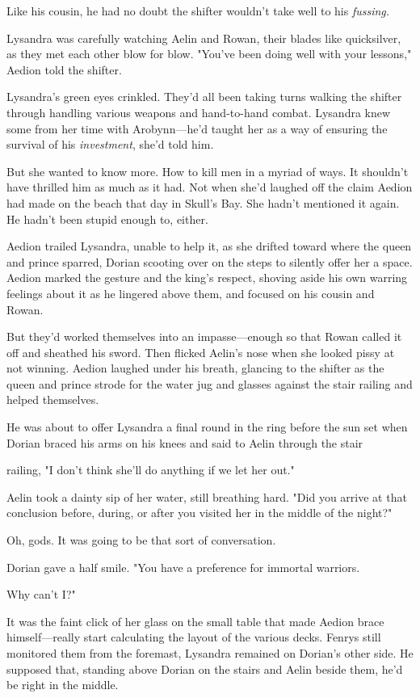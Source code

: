 Like his cousin, he had no doubt the shifter wouldn't take well to his
\emph{fussing.}

Lysandra was carefully watching Aelin and Rowan, their blades like quicksilver, as they met each other blow for blow. "You've been doing well with your lessons," Aedion told the shifter.

Lysandra's green eyes crinkled. They'd all been taking turns walking the shifter through handling various weapons and hand-to-hand combat. Lysandra knew some from her time with Arobynn---he'd taught her as a way of ensuring the survival of his \emph{investment}, she'd told him.

But she wanted to know more. How to kill men in a myriad of ways. It shouldn't have thrilled him as much as it had. Not when she'd laughed off the claim Aedion had made on the beach that day in Skull's Bay. She hadn't mentioned it again. He hadn't been stupid enough to, either.

Aedion trailed Lysandra, unable to help it, as she drifted toward where the queen and prince sparred, Dorian scooting over on the steps to silently offer her a space. Aedion marked the gesture and the king's respect, shoving aside his own warring feelings about it as he lingered above them, and focused on his cousin and Rowan.

But they'd worked themselves into an impasse---enough so that Rowan called it off and sheathed his sword. Then flicked Aelin's nose when she looked pissy at not winning. Aedion laughed under his breath, glancing to the shifter as the queen and prince strode for the water jug and glasses against the stair railing and helped themselves.

He was about to offer Lysandra a final round in the ring before the sun set when Dorian braced his arms on his knees and said to Aelin through the stair

railing, "I don't think she'll do anything if we let her out."

Aelin took a dainty sip of her water, still breathing hard. "Did you arrive at that conclusion before, during, or after you visited her in the middle of the night?"

Oh, gods. It was going to be that sort of conversation.

Dorian gave a half smile. "You have a preference for immortal warriors.

Why can't I?"

It was the faint click of her glass on the small table that made Aedion brace himself---really start calculating the layout of the various decks. Fenrys still monitored them from the foremast, Lysandra remained on Dorian's other side. He supposed that, standing above Dorian on the stairs and Aelin beside them, he'd be right in the middle.


